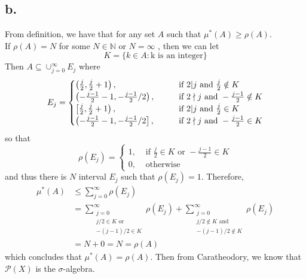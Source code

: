\documentclass[11pt]{article}
\theoremstyle{mystyle}
\theoremstyle{definition}
\begin{document}
\subsection*{b.}
From definition, we have that for any set $A$ such that $\mu^*(A) \ge \rho(A)$. \\ 
If $\rho(A) = N$ for some $N \in \mathbb{N}$ or $N = \infty$ , then we can let 
\[
  K = \{k \in A: \text{k is an integer} \}
\]
Then $A \subseteq \cup_{j=0}^\infty E_j$ where 
\[
  E_j = 
  \begin{cases}
    \left(\frac{j}{2},\frac{j}{2} + 1\right), \indent &\text{ if } 2|j \text{ and } \frac{j}{2} \notin K\\
    \left(-\frac{j-1}{2} -1,-\frac{j-1}{2}/2\right), \indent &\text{ if } 2\nmid j \text{ and } -\frac{j-1}{2} \notin K \\
    \left[\frac{j}{2},\frac{j}{2} + 1\right), \indent &\text{ if } 2|j \text{ and } \frac{j}{2} \in K \\
    \left(-\frac{j-1}{2} -1,-\frac{j-1}{2}/2\right], \indent &\text{ if } 2\nmid j \text{ and } -\frac{j-1}{2} \in K \\
  \end{cases}
\]
so that 
\[
  \rho(E_j) = 
  \begin{cases}
    1, &\text{ if } \frac{j}{2} \in K \text{ or } -\frac{j-1}{2} \in K \\
    0, &\text{ otherwise}
  \end{cases}
\]
and thus there is $N$ interval $E_j$ such that $\rho(E_j) = 1$. Therefore,
\begin{align*}  
  \mu^*(A) 
  &\le \sum_{j=0}^\infty \rho(E_j) \\
  &=  \sum_{\substack{j=0 \\ j/2 \in K \text{ or } \\ -(j-1)/2 \in K}}^\infty \rho(E_j) 
  +  \sum_{\substack{j=0 \\ j/2 \notin K \text{ and } \\ -(j-1)/2 \notin K}}^\infty \rho(E_j) \\
  &= N + 0 = N = \rho(A) 
\end{align*}
which concludes that $\mu^*(A) = \rho(A)$. 
Then from Caratheodory, we know that $\mathcal{P}(X)$ is the $\sigma$-algebra. 
\end{document}
